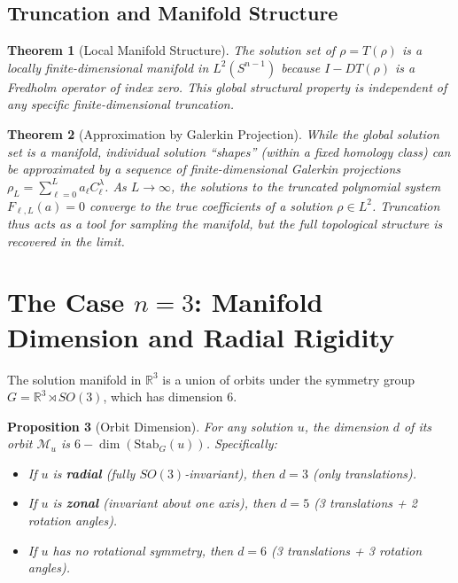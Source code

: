 \documentclass[12pt]{article}
\newtheorem{theorem}{Theorem}[section]
\newtheorem{proposition}[theorem]{Proposition}
\begin{document}
\subsection{Truncation and Manifold Structure}
\begin{theorem}[Local Manifold Structure]
  The solution set of $\rho = T(\rho)$ is a locally finite-dimensional manifold in $L^2(S^{n-1})$ because $I - DT(\rho)$ is a Fredholm operator of index zero. This global structural property is independent of any specific finite-dimensional truncation.
\end{theorem}
\begin{theorem}[Approximation by Galerkin Projection]
  While the global solution set is a manifold, individual solution ``shapes'' (within a fixed homology class) can be approximated by a sequence of finite-dimensional Galerkin projections $\rho_L = \sum_{\ell=0}^L a_\ell C_\ell^\lambda$. As $L \to \infty$, the solutions to the truncated polynomial system $F_{\ell, L}(a) = 0$ converge to the true coefficients of a solution $\rho \in L^2$. Truncation thus acts as a tool for sampling the manifold, but the full topological structure is recovered in the limit.
\end{theorem}

\section{The Case $n=3$: Manifold Dimension and Radial Rigidity}

The solution manifold in $\mathbb{R}^3$ is a union of orbits under the symmetry group $G = \mathbb{R}^3 \rtimes SO(3)$, which has dimension $6$.

\begin{proposition}[Orbit Dimension]
  For any solution $u$, the dimension $d$ of its orbit $\mathcal{M}_u$ is $6 - \dim(\text{Stab}_G(u))$. 
  Specifically:
  \begin{itemize}
    \item If $u$ is \textbf{radial} (fully $SO(3)$-invariant), then $d = 3$ (only translations).
    \item If $u$ is \textbf{zonal} (invariant about one axis), then $d = 5$ (3 translations + 2 rotation angles).
    \item If $u$ has no rotational symmetry, then $d = 6$ (3 translations + 3 rotation angles).
  \end{itemize}
\end{proposition}
\end{document}
